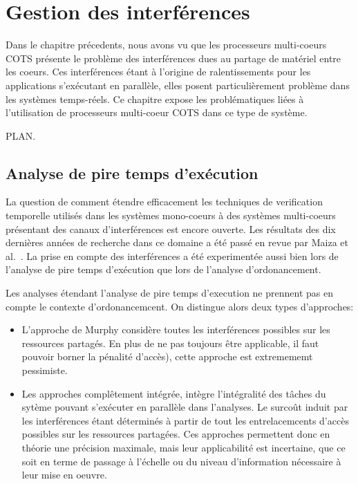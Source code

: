 \chapter{Gestion des interférences}

Dans le chapitre précedents, nous avons vu que les processeurs multi-coeurs COTS présente le problème des interférences dues au partage de matériel entre les coeurs.
Ces interférences étant à l'origine de ralentissements pour les applications s'exécutant en parallèle, elles posent particulièrement problème dans les systèmes temps-réels.
Ce chapitre expose les problématiques liées à l'utilisation de processeurs multi-coeur COTS dans ce type de système.

PLAN.

\section{Analyse de pire temps d'exécution}

La question de comment étendre efficacement les techniques de verification temporelle utilisés dans les systèmes mono-coeurs à des systèmes multi-coeurs présentant des canaux d'interférences est encore ouverte.
Les résultats des dix dernières années de recherche dans ce domaine a été passé en revue par Maiza et al.~\cite{maiza2018survey}.
La prise en compte des interférences a été experimentée aussi bien lors de l'analyse de pire temps d'exécution que lors de l'analyse d'ordonancement.

Les analyses étendant l'analyse de pire temps d'execution ne prennent pas en compte le contexte d'ordonancemcent.
On distingue alors deux types d'approches:
\begin{itemize}
	\item L'approche de Murphy considère toutes les interférences possibles sur les ressources partagés.
	En plus de ne pas toujours être applicable, il faut pouvoir borner la pénalité d'accès), cette approche est extremememt pessimiste.
	\item Les approches complêtement intégrée, intègre l'intégralité des tâches du sytème pouvant s'exécuter en parallèle dans l'analyses.
	Le surcoût induit par les interférences étant déterminés à partir de tout les entrelacemcents d'accès possibles sur les ressources partagées.
	Ces approches permettent donc en théorie une précision maximale, mais leur applicabilité est incertaine, que ce soit en terme de passage à l'échelle ou du niveau d'information nécessaire à leur mise en oeuvre. 
\end{itemize}


